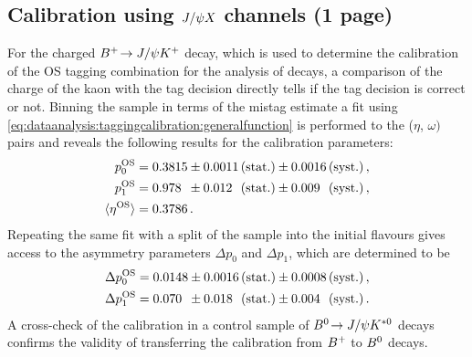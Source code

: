 
\subsection{Calibration using \texorpdfstring{$J/\psi X$}{JpsiX} channels (1 page)}
\label{sec:dataanalysis:taggingcalibration:jpsixcalibration}

For the charged ${{B}^+}\!\rightarrow J/\psi{\ensuremath{{K}^+}}$ decay, which is used to determine the calibration
of the OS tagging combination for the analysis of \BdToJPsiKS decays, a
comparison of the charge of the kaon with the tag decision directly tells if
the tag decision is correct or not. Binning the sample in terms of the mistag
estimate a \chisq fit using
\cref{eq:dataanalysis:taggingcalibration:generalfunction} is performed to the
($\eta$, $\omega)$ pairs and reveals the following results for the calibration
parameters:
\begin{equation}
\begin{aligned}
  p_0^{\text{OS}} &= 0.3815 \pm 0.0011 \text{\,(stat.)}
                            \pm 0.0016 \text{\,(syst.)} \, ,\\
  p_1^{\text{OS}} &= 0.978\phantom{0} \pm 0.012\phantom{0} \text{\,(stat.)}
                                      \pm 0.009\phantom{0} \text{\,(syst.)} \, ,\\
  \langle\eta^{\text{OS}}\rangle &= 0.3786 \, .
\end{aligned}
\label{eq:dataanalysis:taggingcalibration:jpsixcalibration:os_calibration_pars}
\end{equation}
Repeating the same fit with a split of the sample into the initial flavours
gives access to the asymmetry parameters $\Delta p_0$ and $\Delta p_1$, which
are determined to be
\begin{equation}
\begin{split}
  \Delta p_0^{\text{OS}} &= 0.0148 \pm 0.0016 \text{\,(stat.)} \pm  0.0008 \text{\,(syst.)} \, , \\
  \Delta p_1^{\text{OS}} &= 0.070\phantom{0} \pm 0.018\phantom{0} \text{\,(stat.)} \pm 0.004\phantom{0} \text{\,(syst.)} \,.
\end{split}
\label{eq:dataanalysis:taggingcalibration:jpsixcalibration:os_calibration_asymmetries}
\end{equation}
A cross-check of the calibration in a control sample of ${{B}^0}\!\rightarrow J/\psi{\ensuremath{{K}^{*0}}}$
decays confirms the validity of transferring the calibration from ${{B}^+}$ to
${{B}^0}$ decays.

